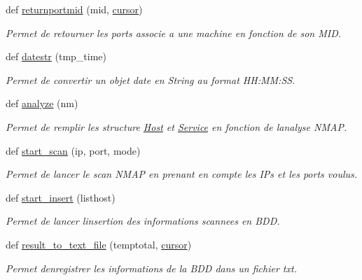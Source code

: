 \begin{DoxyCompactItemize}
def \hyperlink{namespacescan__without__thread_a10fe610293f37448f5ec2c055c2d8bef}{returnportmid} (mid, \hyperlink{namespacescan__without__thread_ab96035c23ecba59ad9570c46c57b7aa0}{cursor})
\begin{DoxyCompactList}\small\item\em Permet de retourner les ports associe a une machine en fonction de son M\+ID. \end{DoxyCompactList}\item 
def \hyperlink{namespacescan__without__thread_a839493580dc884b3f2120cad978d60d3}{datestr} (tmp\+\_\+time)
\begin{DoxyCompactList}\small\item\em Permet de convertir un objet date en String au format H\+H\+:\+MM\+:SS. \end{DoxyCompactList}\item 
def \hyperlink{namespacescan__without__thread_a64a022051a037c1dcd65d92c6cf783c0}{analyze} (nm)
\begin{DoxyCompactList}\small\item\em Permet de remplir les structure \hyperlink{classscan__without__thread_1_1Host}{Host} et \hyperlink{classscan__without__thread_1_1Service}{Service} en fonction de l\textquotesingle{}analyse N\+M\+AP. \end{DoxyCompactList}\item 
def \hyperlink{namespacescan__without__thread_a1085b956f7408fe1a9b3ff54fbc66984}{start\+\_\+scan} (ip, port, mode)
\begin{DoxyCompactList}\small\item\em Permet de lancer le scan N\+M\+AP en prenant en compte les I\+Ps et les ports voulus. \end{DoxyCompactList}\item 
def \hyperlink{namespacescan__without__thread_ad65f26909b7969fdaab937bbf27cf329}{start\+\_\+insert} (listhost)
\begin{DoxyCompactList}\small\item\em Permet de lancer l\textquotesingle{}insertion des informations scannees en B\+DD. \end{DoxyCompactList}\item 
def \hyperlink{namespacescan__without__thread_a4e3953068dc120adafff06dc2afcc537}{result\+\_\+to\+\_\+text\+\_\+file} (temptotal, \hyperlink{namespacescan__without__thread_ab96035c23ecba59ad9570c46c57b7aa0}{cursor})
\begin{DoxyCompactList}\small\item\em Permet d\textquotesingle{}enregistrer les informations de la B\+DD dans un fichier txt. \end{DoxyCompactList}\item 

\end{DoxyCompactItemize}
